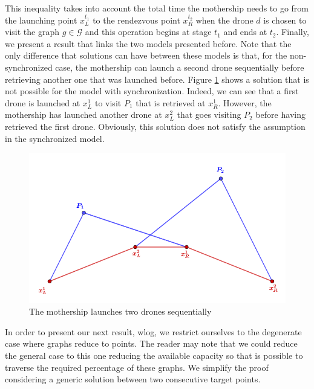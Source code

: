 \noindent
This inequality takes into account the total time the mothership needs to go from the launching point $x_L^{t_1}$ to the rendezvous point $x_R^{t_2}$ when  the drone $d$ is chosen to visit the graph $g\in\mathcal G$ and this operation begins at stage $t_1$ and ends at $t_2$.
\noindent
Finally, we present a result that links the two models presented before. Note that the only difference that solutions can have between these models is that, for the non-synchronized case, the mothership can launch a second drone sequentially before retrieving another one that was launched before. Figure \ref{fig:proof1} shows a solution that is not possible for the model with synchronization. Indeed, we can see that a first drone is launched at $x_L^1$ to visit $P_1$ that is retrieved at $x_R^1$. However, the mothership has launched another drone at $x_L^2$ that goes visiting $P_2$ before having retrieved the first drone. Obviously, this solution does not satisfy the assumption in the synchronized model. 


\begin{figure}[h!]
    \centering
    \includegraphics[width = 0.7\linewidth]{proof1.PNG}
    \caption{The mothership launches two drones sequentially}
    \label{fig:proof1}
\end{figure}

\noindent
In order to present our next result, wlog,  we restrict ourselves to the degenerate case where graphs reduce to points. The reader may note that we could reduce the general case to this one reducing the available capacity so that is possible to traverse the required percentage of these graphs. We simplify the proof considering a generic solution between two consecutive target points.


